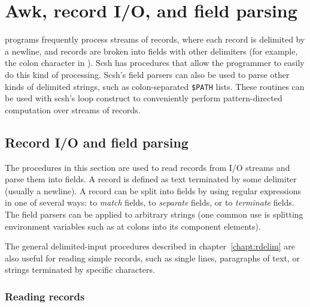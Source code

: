 
\chapter{Awk, record I/O, and field parsing}
\label{chapt:fr-awk}

{\Unix} programs frequently process streams of records, 
where each record is delimited by a newline, 
and records are broken into fields with other delimiters
(for example, the colon character in ).
Scsh has procedures that allow the programmer to easily
do this kind of processing.
Scsh's field parsers can also be used to parse other kinds
of delimited strings, such as colon-separated \verb|$PATH| lists.
These routines can be used with scsh's  loop construct
to conveniently perform pattern-directed computation over streams
of records.


\section{Record I/O and field parsing}
\label{sec:field-reader}

The procedures in this section are used to read records from
I/O streams and parse them into fields.
A record is defined as text terminated by some delimiter (usually a newline).
A record can be split into fields by using regular expressions in
one of several ways: to \emph{match} fields, to \emph{separate} fields,
or to \emph{terminate} fields.
The field parsers can be applied to arbitrary strings (one common use is
splitting environment variables such as  at colons into its
component elements).

The general delimited-input procedures described in
chapter~\ref{chapt:rdelim} are also useful for reading simple records, 
such as single lines, paragraphs of text, or strings terminated by specific
characters.

\subsection{Reading records}

